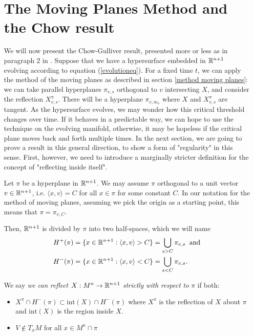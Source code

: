 \section{The Moving Planes Method and the Chow result}

We will now present the Chow-Gulliver result, presented more or less as in paragraph 2 in \cite{Chow}.
Suppose that we have a hypersurface embedded in $\mathbb{R}^{n+1}$ evolving according to equation (\ref{evolutioneq}). For a fixed time $t$, we can apply the method of the moving planes as described in section \ref{method moving planes}: we can take parallel hyperplanes $\pi_{v,s}$ orthogonal to $v$ intersecting $X$, and consider the reflection  $X_{v,s}^\pi$. There will be a hyperplane $\pi_{v,m_v}$ where $X$ and $X_{v,s}^\pi$ are tangent. As the hypersurface evolves, we may wonder how this critical threshold changes over time. If it behaves in a predictable way, we can hope to use the technique on the evolving manifold, otherwise, it may be hopeless if the critical plane moves back and forth multiple times. In the next section, we are going to prove a result in this general direction, to show a form of "regularity" in this sense. First, however, we need to introduce a marginally stricter definition for the concept of "reflecting inside itself". 



Let $\pi$ be a hyperplane in $\mathbb{R}^{n+1}$. We may assume $\pi$ orthogonal to a unit vector $v\in\mathbb{R}^{n+1}$, i.e. $\langle x, v\rangle= C$ for all $x\in \pi$ for some constant $C$. In our notation for the method of moving planes, assuming we pick the origin as a starting point, this means that $\pi = \pi_{v, C}$. 

Then, $\mathbb{R}^{n+1}$ is divided by $\pi$ into two half-spaces, which we will name 
\begin{align*}
H^+(\pi)&=\{x \in \mathbb{R}^{n+1} : \langle x, v\rangle > C\}= \bigcup_{s>C} \pi_{v, s} \;\;\mathrm{and}\\
H^-(\pi)&=\{x \in \mathbb{R}^{n+1} : \langle x, v\rangle < C\}= \bigcup_{s<C} \pi_{v, s}.
\end{align*} 

\begin{defin}
	We say {\em we can reflect $X: M^n\rightarrow \mathbb{R}^{n+1}$ strictly with respect to $\pi$} if both:
	\begin{itemize}
		\item $X^\pi\cap H^-(\pi)\subset \mathrm{int}(X)\cap H^-(\pi)$ where $X^\pi$ is the reflection of $X$ about $\pi$ and $\mathrm{int}(X)$ is the region inside $X$.
		\item $V\notin T_xM$ for all $x\in M^n \cap\pi$
	\end{itemize} \label{strict-reflection-definition}
\end{defin}


